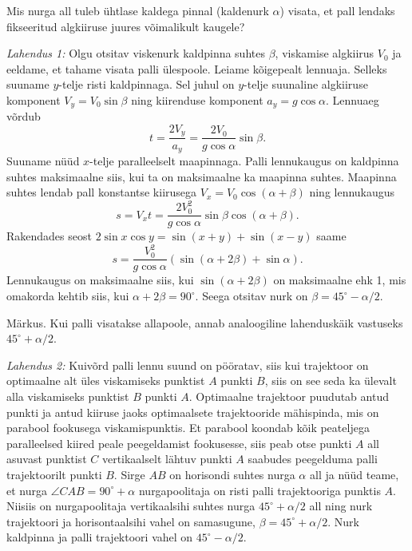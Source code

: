 
Mis nurga all tuleb ühtlase kaldega pinnal (kaldenurk $\alpha$) visata, et pall lendaks fikseeritud algkiiruse juures võimalikult kaugele?


\hint

\solu
\emph{Lahendus 1:} Olgu otsitav viskenurk kaldpinna suhtes $\beta$, viskamise algkiirus $V_0$ ja eeldame, et tahame visata palli ülespoole. Leiame kõigepealt lennuaja. Selleks suuname $y$-telje risti kaldpinnaga. Sel juhul on $y$-telje suunaline algkiiruse komponent $V_y=V_0\sin\beta$ ning kiirenduse komponent $a_y=g\cos\alpha$. Lennuaeg võrdub
$$t=\frac{2V_y}{a_y}=\frac{2V_0}{g\cos\alpha}\sin\beta.$$
Suuname nüüd $x$-telje paralleelselt maapinnaga. Palli lennukaugus on kaldpinna suhtes maksimaalne siis, kui ta on maksimaalne ka maapinna suhtes. Maapinna suhtes lendab pall konstantse kiirusega $V_x=V_0\cos(\alpha+\beta)$ ning lennukaugus
$$s=V_xt=\frac{2V_0^2}{g\cos\alpha}\sin\beta\cos(\alpha+\beta).$$
Rakendades seost $2\sin x\cos y=\sin(x+y)+\sin(x-y)$ saame
$$s=\frac{V_0^2}{g\cos\alpha}(\sin(\alpha+2\beta)+\sin\alpha).$$
Lennukaugus on maksimaalne siis, kui $\sin(\alpha+2\beta)$ on maksimaalne ehk 1, mis omakorda kehtib siis, kui $\alpha+2\beta=90^\circ$. Seega otsitav nurk on $\beta =45^\circ-\alpha /2$.

Märkus. Kui palli visatakse allapoole, annab analoogiline lahenduskäik vastuseks $45^\circ+\alpha /2$.

\emph{Lahendus 2:} Kuivõrd palli lennu suund on pööratav, siis kui trajektoor on optimaalne alt üles viskamiseks punktist $A$ punkti $B$, siis on see seda ka ülevalt alla viskamiseks punktist $B$ punkti $A$. Optimaalne trajektoor puudutab antud punkti ja antud kiiruse jaoks optimaalsete trajektooride mähispinda, mis on parabool fookusega viskamispunktis. Et parabool koondab kõik peateljega paralleelsed kiired peale peegeldamist fookusesse, siis peab otse punkti $A$ all asuvast punktist $C$ vertikaalselt lähtuv punkti $A$ saabudes peegelduma palli trajektoorilt punkti $B$. Sirge $AB$ on horisondi suhtes nurga $\alpha$ all ja nüüd teame, et nurga $\angle CAB=90^\circ +\alpha$ nurgapoolitaja on risti palli trajektooriga punktis $A$. Niisiis on nurgapoolitaja vertikaalsihi suhtes nurga $45^\circ +\alpha/2$ all ning nurk trajektoori ja horisontaalsihi vahel on samasugune, $\beta = 45^\circ +\alpha/2$. Nurk kaldpinna ja palli trajektoori vahel on $45^\circ -\alpha/2$.


